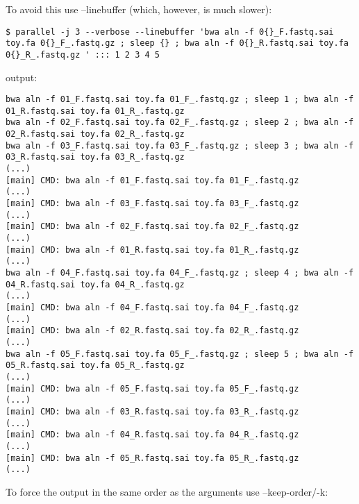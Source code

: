 \documentclass{article}
\begin{document}
To avoid this use --linebuffer (which, however, is much slower):
\begin{lstlisting}
$ parallel -j 3 --verbose --linebuffer 'bwa aln -f 0{}_F.fastq.sai toy.fa 0{}_F_.fastq.gz ; sleep {} ; bwa aln -f 0{}_R.fastq.sai toy.fa 0{}_R_.fastq.gz ' ::: 1 2 3 4 5
\end{lstlisting}
output:
\begin{lstlisting}
bwa aln -f 01_F.fastq.sai toy.fa 01_F_.fastq.gz ; sleep 1 ; bwa aln -f 01_R.fastq.sai toy.fa 01_R_.fastq.gz 
bwa aln -f 02_F.fastq.sai toy.fa 02_F_.fastq.gz ; sleep 2 ; bwa aln -f 02_R.fastq.sai toy.fa 02_R_.fastq.gz 
bwa aln -f 03_F.fastq.sai toy.fa 03_F_.fastq.gz ; sleep 3 ; bwa aln -f 03_R.fastq.sai toy.fa 03_R_.fastq.gz 
(...)
[main] CMD: bwa aln -f 01_F.fastq.sai toy.fa 01_F_.fastq.gz
(...)
[main] CMD: bwa aln -f 03_F.fastq.sai toy.fa 03_F_.fastq.gz
(...)
[main] CMD: bwa aln -f 02_F.fastq.sai toy.fa 02_F_.fastq.gz
(...)
[main] CMD: bwa aln -f 01_R.fastq.sai toy.fa 01_R_.fastq.gz
(...)
bwa aln -f 04_F.fastq.sai toy.fa 04_F_.fastq.gz ; sleep 4 ; bwa aln -f 04_R.fastq.sai toy.fa 04_R_.fastq.gz 
(...)
[main] CMD: bwa aln -f 04_F.fastq.sai toy.fa 04_F_.fastq.gz
(...)
[main] CMD: bwa aln -f 02_R.fastq.sai toy.fa 02_R_.fastq.gz
(...)
bwa aln -f 05_F.fastq.sai toy.fa 05_F_.fastq.gz ; sleep 5 ; bwa aln -f 05_R.fastq.sai toy.fa 05_R_.fastq.gz 
(...)
[main] CMD: bwa aln -f 05_F.fastq.sai toy.fa 05_F_.fastq.gz
(...)
[main] CMD: bwa aln -f 03_R.fastq.sai toy.fa 03_R_.fastq.gz
(...)
[main] CMD: bwa aln -f 04_R.fastq.sai toy.fa 04_R_.fastq.gz
(...)
[main] CMD: bwa aln -f 05_R.fastq.sai toy.fa 05_R_.fastq.gz
(...)
\end{lstlisting}

To force the output in the same order as the arguments use --keep-order/-k:
\end{document}
